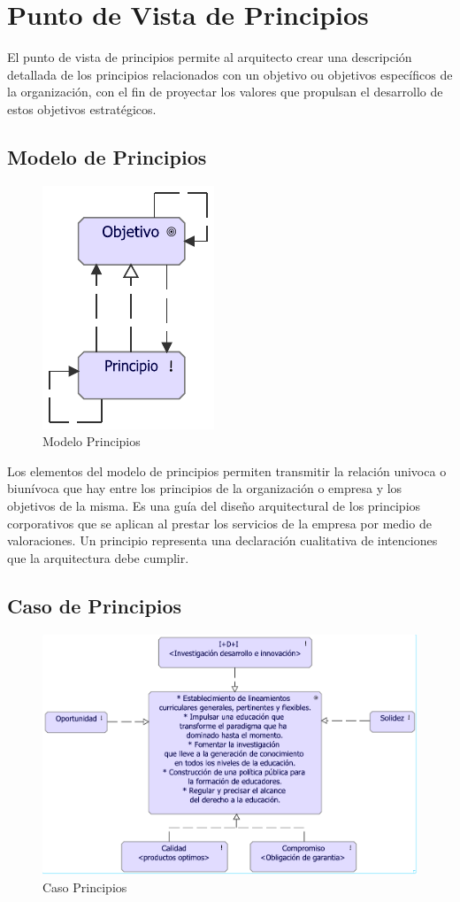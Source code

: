 \section{Punto de Vista de Principios}
El punto de vista de principios permite al arquitecto crear una descripción detallada de los principios relacionados con un objetivo ou objetivos específicos de la organización, con el fin de proyectar los valores que propulsan el desarrollo de estos objetivos estratégicos.

\subsection{Modelo de Principios}
\begin{figure}[h]
	\centering
	\includegraphics[width=0.3\linewidth]{imgs/modelo/Principios}
	\caption{Modelo Principios}
\end{figure}

Los elementos del modelo de principios permiten transmitir la relación univoca o biunívoca que hay entre los principios de la organización o empresa y los objetivos de la misma. Es una guía del diseño arquitectural de los principios corporativos que se aplican al prestar los servicios de la empresa por medio de valoraciones. Un principio representa una declaración cualitativa de intenciones que la arquitectura debe cumplir.


\subsection{Caso  de Principios}
\begin{figure}[h]
	\centering
	\includegraphics[width=1.0\linewidth]{imgs/motivacion/principios/principios}
	\caption{Caso Principios}
\end{figure}

